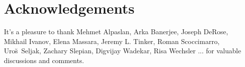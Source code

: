 \documentclass[12pt, letterpaper, preprint]{aastex62}
\begin{document}




 





 

\section*{Acknowledgements}
It's a pleasure to thank 
    Mehmet Alpaslan, 
    Arka Banerjee, 
    Joseph DeRose, 
    Mikhail Ivanov, 
    Elena Massara,
    Jeremy L. Tinker,
    Roman Scoccimarro, 
    Uro{\u s}~Seljak,
    Zachary Slepian, 
    Digvijay Wadekar,
    Risa Wechsler
    ...
for valuable discussions and comments. 

\appendix


 
\end{document}
